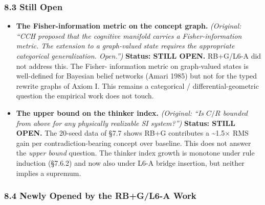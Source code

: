 \documentclass[
  11pt,
  a4paper,
]{article}
\begin{document}
\subsubsection{8.3 Still Open}\label{still-open}

\begin{itemize}
\item
  \textbf{The Fisher-information metric on the concept graph.}
  \emph{(Original: ``CCH proposed that the cognitive manifold carries a
  Fisher-information metric. The extension to a graph-valued state
  requires the appropriate categorical generalization. Open.'')}
  \textbf{Status: STILL OPEN.} RB+G/L6-A did not address this. The
  Fisher- information metric on graph-valued states is well-defined for
  Bayesian belief networks (Amari 1985) but not for the typed rewrite
  graphs of Axiom I. This remains a categorical / differential-geometric
  question the empirical work does not touch.
\item
  \textbf{The upper bound on the thinker index.} \emph{(Original: ``Is
  \(C/R\) bounded from above for any physically realizable SI
  system?'')} \textbf{Status: STILL OPEN.} The 20-seed data of §7.7
  shows RB+G contributes a \textasciitilde1.5× RMS gain per
  contradiction-bearing concept over baseline. This does not answer the
  \emph{upper bound} question. The thinker index growth is monotone
  under rule induction (§7.6.2) and now also under L6-A bridge
  insertion, but neither implies a supremum.
\end{itemize}

\subsubsection{8.4 Newly Opened by the RB+G/L6-A
Work}\label{newly-opened-by-the-rbgl6-a-work}
\end{document}
